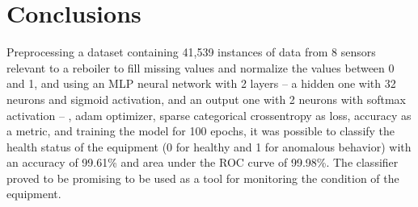 \documentclass[a4paper,fleqn]{cas-sc}
\begin{document}
	
	\section{Conclusions}\label{sec:conclusion}
	
	Preprocessing a dataset containing 41,539 instances of data from 8 sensors relevant to a reboiler to fill missing values and normalize the values between 0 and 1, and using an MLP neural network with 2 layers -- a hidden one with 32 neurons and sigmoid activation, and an output one with 2 neurons with softmax activation -- , adam optimizer, sparse categorical crossentropy as loss, accuracy as a metric, and training the model for 100 epochs, it was possible to classify the health status of the equipment (0 for healthy and 1 for anomalous behavior) with an accuracy of 99.61\% and area under the ROC curve of 99.98\%. The classifier proved to be promising to be used as a tool for monitoring the condition of the equipment.
		
	
	
	
	
%	
	
	
\end{document}
